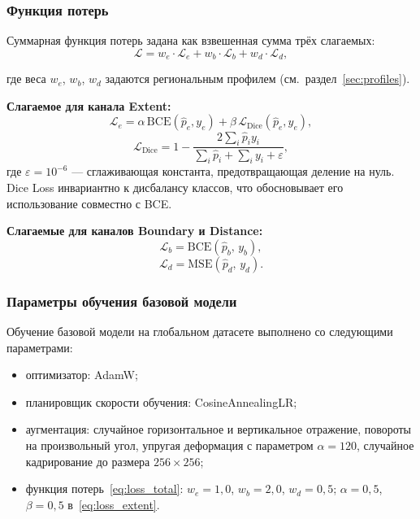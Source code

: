 \documentclass[14pt,a4paper]{extarticle}
\begin{document}
\subsubsection{Функция потерь}
\label{sec:loss}

Суммарная функция потерь задана как взвешенная сумма трёх слагаемых:
\begin{equation}
  \mathcal{L} = w_e \cdot \mathcal{L}_{e} + w_b \cdot \mathcal{L}_{b}
              + w_d \cdot \mathcal{L}_{d},
  \label{eq:loss_total}
\end{equation}

где веса $w_e$, $w_b$, $w_d$ задаются региональным профилем
(см.~раздел~\ref{sec:profiles}).

\textbf{Слагаемое для канала Extent:}
\begin{equation}
  \mathcal{L}_{e} = \alpha\,\text{BCE}(\hat{p}_e, y_e)
                  + \beta\,\mathcal{L}_{\text{Dice}}(\hat{p}_e, y_e),
  \label{eq:loss_extent}
\end{equation}
\begin{equation}
  \mathcal{L}_{\text{Dice}} = 1 - \frac{2\sum_{i}\hat{p}_i y_i}
                                       {\sum_{i}\hat{p}_i + \sum_{i}y_i + \varepsilon},
  \label{eq:dice}
\end{equation}
где $\varepsilon = 10^{-6}$ — сглаживающая константа, предотвращающая
деление на нуль. Dice Loss инвариантно к дисбалансу классов, что обосновывает
его использование совместно с BCE.

\textbf{Слагаемые для каналов Boundary и Distance:}
\begin{equation}
  \mathcal{L}_{b} = \text{BCE}(\hat{p}_b,\, y_b),
  \label{eq:loss_boundary}
\end{equation}
\begin{equation}
  \mathcal{L}_{d} = \text{MSE}(\hat{p}_d,\, y_d).
  \label{eq:loss_distance}
\end{equation}

\subsubsection{Параметры обучения базовой модели}

Обучение базовой модели на глобальном датасете выполнено со следующими
параметрами:
\begin{itemize}
  \item оптимизатор: AdamW;
  \item планировщик скорости обучения: CosineAnnealingLR;
  \item аугментация: случайное горизонтальное и вертикальное отражение,
        повороты на произвольный угол, упругая деформация с параметром
        $\alpha = 120$, случайное кадрирование до размера $256\times256$;
  \item функция потерь~\eqref{eq:loss_total}: $w_e = 1{,}0$,
        $w_b = 2{,}0$, $w_d = 0{,}5$;
        $\alpha = 0{,}5$, $\beta = 0{,}5$ в~\eqref{eq:loss_extent}.
\end{itemize}
\end{document}
